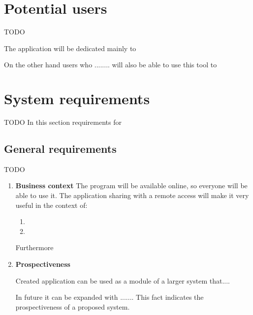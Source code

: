 \section{Potential users}
TODO
\label{users}

The application will be dedicated mainly to 

On the other hand users who ........ will also be able to use this tool to 


\section{System requirements}
TODO
In this section requirements for

\subsection{General requirements}
TODO

\begin{enumerate}

\item \textbf{Business context} The program will be available online, so everyone will be able to use it. The application sharing with a remote access will make it very useful in the context of:

\begin{enumerate}

\item 

\item 

\end{enumerate}

Furthermore 

\item \textbf{Prospectiveness}

Created application can be used as a module of a larger system that.... 

In future it can be expanded with ....... This fact indicates the prospectiveness of a proposed system. 

\end{enumerate}

